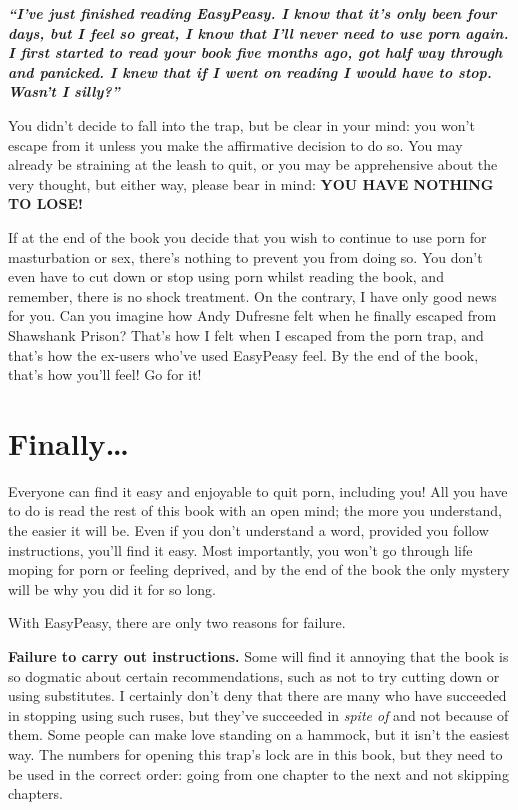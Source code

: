 \documentclass[
]{book}
\begin{document}
\textbf{\emph{``I've just finished reading EasyPeasy. I know that it's only been four days, but I feel so great, I know that I'll never need to use porn again. I first started to read your book five months ago, got half way through and panicked. I knew that if I went on reading I would have to stop. Wasn't I silly?''}}

You didn't decide to fall into the trap, but be clear in your mind: you won't escape from it unless you make the affirmative decision to do so. You may already be straining at the leash to quit, or you may be apprehensive about the very thought, but either way, please bear in mind: \textbf{YOU HAVE NOTHING TO LOSE!}

If at the end of the book you decide that you wish to continue to use porn for masturbation or sex, there's nothing to prevent you from doing so. You don't even have to cut down or stop using porn whilst reading the book, and remember, there is no shock treatment. On the contrary, I have only good news for you. Can you imagine how Andy Dufresne felt when he finally escaped from Shawshank Prison? That's how I felt when I escaped from the porn trap, and that's how the ex-users who've used EasyPeasy feel. By the end of the book, that's how you'll feel! Go for it!

\hypertarget{finally}{%
\section*{Finally\ldots{}}\label{finally}}

Everyone can find it easy and enjoyable to quit porn, including you! All you have to do is read the rest of this book with an open mind; the more you understand, the easier it will be. Even if you don't understand a word, provided you follow instructions, you'll find it easy. Most importantly, you won't go through life moping for porn or feeling deprived, and by the end of the book the only mystery will be why you did it for so long.

With EasyPeasy, there are only two reasons for failure.

\textbf{Failure to carry out instructions.}
Some will find it annoying that the book is so dogmatic about certain recommendations, such as not to try cutting down or using substitutes. I certainly don't deny that there are many who have succeeded in stopping using such ruses, but they've succeeded in \emph{spite of} and not because of them. Some people can make love standing on a hammock, but it isn't the easiest way. The numbers for opening this trap's lock are in this book, but they need to be used in the correct order: going from one chapter to the next and not skipping chapters.
\end{document}
